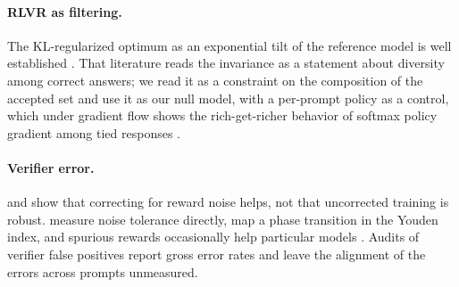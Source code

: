 \paragraph{RLVR as filtering.} The KL-regularized optimum as an exponential tilt of the reference model is well established \citep{korbak2022bayesian, gai2025smoothing, kruszewski2026filtering, dymetman2026binary, lochab2026ucpo, rafailov2023dpo, yue2025rlincentivize}. That literature reads the invariance as a statement about diversity among correct answers; we read it as a constraint on the composition of the accepted set and use it as our null model, with a per-prompt policy as a control, which under gradient flow shows the rich-get-richer behavior of softmax policy gradient among tied responses \citep{mei2020global, lochab2026ucpo}.

\paragraph{Verifier error.} \citet{wang2020perturbed} and \citet{cai2025noisyverifier} show that correcting for reward noise helps, not that uncorrected training is robust. \citet{plesner2026imperfect} measure noise tolerance directly, \citet{rad2026rateorfate} map a phase transition in the Youden index, and spurious rewards occasionally help particular models \citep{shao2025spurious}. Audits of verifier false positives \citep{zhao2025onetoken, huang2025verifiers, xu2025tinyv, yuan2026miracle} report gross error rates and leave the alignment of the errors across prompts unmeasured.

